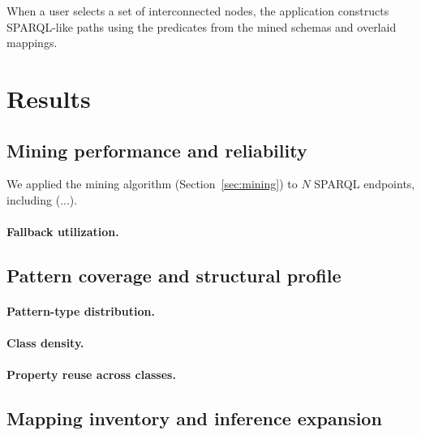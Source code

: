 \documentclass[12pt]{article}
\begin{document}
When a user selects a set of interconnected nodes, the application constructs SPARQL-like paths
using the predicates from the mined schemas and overlaid mappings.                              %

\section{Results}

\subsection{Mining performance and reliability}
\label{sec:results-mining}

We applied the mining algorithm (Section~\ref{sec:mining}) to $N$
SPARQL endpoints, including (...).


\paragraph*{Fallback utilization.}

\subsection{Pattern coverage and structural profile}
\label{sec:results-patterns}

\paragraph*{Pattern-type distribution.}

\paragraph*{Class density.}


\paragraph*{Property reuse across classes.}

\subsection{Mapping inventory and inference expansion}
\label{sec:results-mappings}
\end{document}
